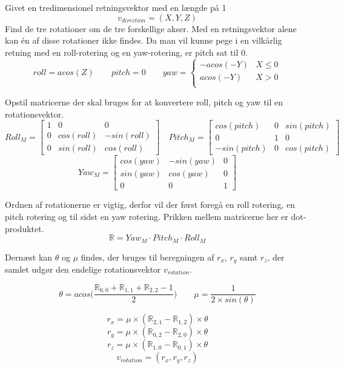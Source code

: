 \begin{itemize}
Givet en tredimensionel retningsvektor med en længde på 1
$$
v_{direction} = (X, Y, Z)
$$
Find de tre rotationer om de tre forskellige akser. Med en retningsvektor alene kan én af disse rotationer ikke findes. Da man vil kunne pege i en vilkårlig retning med en roll-rotering og en yaw-rotering, er pitch sat til 0.
$$ 
roll = acos(Z) \qquad 
pitch = 0 \qquad 
yaw = \begin{cases} 
	-acos(-Y) & X \leq 0\\
	acos(-Y)  & X > 0 \\
\end{cases}
$$

Opstil matricerne der skal bruges for at konvertere roll, pitch og yaw til en rotationsvektor.
$$ 
Roll_M = \begin{bmatrix}
    1 & 0 & 0 \\
    0 & cos(roll) & -sin(roll) \\
    0 & sin(roll) & cos(roll)
\end{bmatrix}
\quad
Pitch_M = \begin{bmatrix}
    cos(pitch) & 0 & sin(pitch) \\
    0 & 1 & 0 \\
    -sin(pitch) & 0 & cos(pitch)
\end{bmatrix} 
$$
$$
Yaw_M = \begin{bmatrix}
    cos(yaw) & -sin(yaw) & 0 \\
    sin(yaw) & cos(yaw) & 0 \\
    0 & 0 & 1
\end{bmatrix}
$$ 

Ordnen af rotationerne er vigtig, derfor vil der først foregå en roll rotering, en pitch rotering og til sidst en yaw rotering. Prikken mellem matricerne her er dot-produktet.
$$\mathbb{R} = Yaw_M \cdot Pitch_M \cdot Roll_M $$

Dernæst kan $\theta$ og $\mu$ findes, der bruges til beregningen af $r_x$, $r_y$ samt $r_z$, der samlet udgør den endelige rotationsvektor $v_{rotation}$.

$$\theta = acos\bigg(\frac{\mathbb{R}_{0,0}+\mathbb{R}_{1,1}+\mathbb{R}_{2,2}-1}{2}\bigg) \qquad \mu = \frac{1}{2 \times sin(\theta)}$$

$$r_x =\mu \times(\mathbb{R}_{2,1}-\mathbb{R}_{1,2}) \times\theta $$
$$r_y =\mu \times(\mathbb{R}_{0,2}-\mathbb{R}_{2,0}) \times\theta $$
$$r_z =\mu \times(\mathbb{R}_{1,0}-\mathbb{R}_{0,1}) \times\theta $$
$$v_{rotation} = (r_x, r_y, r_z)$$

\end{itemize}

